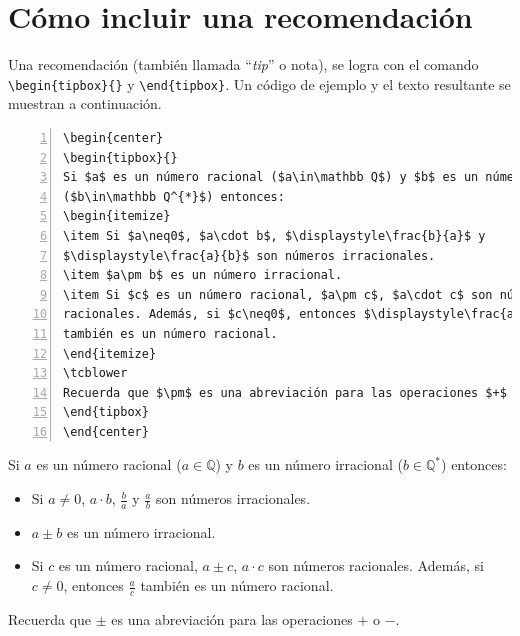 \documentclass[11pt,letterpaper,twoside]{report}%
\begin{document}
\section{Cómo incluir una recomendación}\label{sec:recomendacion}

Una recomendación (también llamada ``{\em tip}'' o nota), se logra con el comando \verb|\begin{tipbox}{}| y \verb|\end{tipbox}|. Un código de ejemplo y el texto resultante se muestran a continuación.

\begin{Verbatim}[frame=single,framesep=5mm,rulecolor=\color{gray},numbers=left,numbersep=-10pt]
\begin{center}
\begin{tipbox}{}
Si $a$ es un número racional ($a\in\mathbb Q$) y $b$ es un número irracional
($b\in\mathbb Q^{*}$) entonces:
\begin{itemize}
\item Si $a\neq0$, $a\cdot b$, $\displaystyle\frac{b}{a}$ y 
$\displaystyle\frac{a}{b}$ son números irracionales.
\item $a\pm b$ es un número irracional.
\item Si $c$ es un número racional, $a\pm c$, $a\cdot c$ son números
racionales. Además, si $c\neq0$, entonces $\displaystyle\frac{a}{c}$ 
también es un número racional.
\end{itemize}
\tcblower
Recuerda que $\pm$ es una abreviación para las operaciones $+$ o $-$.
\end{tipbox}
\end{center}
\end{Verbatim}


\begin{center}
\begin{tipbox}{}
Si $a$ es un número racional ($a\in\mathbb Q$) y $b$ es un número irracional ($b\in\mathbb Q^{*}$) entonces:
\begin{itemize}
\item Si $a\neq0$, $a\cdot b$, $\displaystyle\frac{b}{a}$ y $\displaystyle\frac{a}{b}$ son números irracionales.
\item $a\pm b$ es un número irracional.
\item Si $c$ es un número racional, $a\pm c$, $a\cdot c$ son números racionales. Además, si $c\neq0$, entonces $\displaystyle\frac{a}{c}$ también es un número racional.
\end{itemize}
\tcblower
Recuerda que $\pm$ es una abreviación para las operaciones $+$ o $-$.
\end{tipbox}
\end{center}
\end{document}
